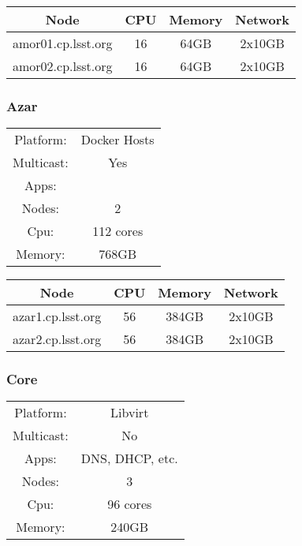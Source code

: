 \begin{center}
  \begin{tabular}{||c c c c||} 
    \hline
    Node & CPU & Memory & Network \\ [0.5ex] 
    \hline\hline
    amor01.cp.lsst.org & 16 & 64GB & 2x10GB \\
    \hline
    amor02.cp.lsst.org & 16 & 64GB & 2x10GB \\
    \hline
  \end{tabular}
\end{center}

\subsubsection{Azar}

\begin{center}
  \begin{tabular}{ |c|c| } 
   \hline
   Platform: & Docker Hosts \\ 
   Multicast: & Yes \\ 
   Apps: &  \\ 
   Nodes: & 2 \\ 
   Cpu: & 112 cores \\ 
   Memory: & 768GB \\ 
   \hline
  \end{tabular}
\end{center}

\begin{center}
  \begin{tabular}{||c c c c||} 
    \hline
    Node & CPU & Memory & Network \\ [0.5ex] 
    \hline\hline
    azar1.cp.lsst.org & 56 & 384GB & 2x10GB \\
    \hline
    azar2.cp.lsst.org & 56 & 384GB & 2x10GB \\
    \hline
  \end{tabular}
\end{center}

\newpage
\subsubsection{Core}

\begin{center}
  \begin{tabular}{ |c|c| } 
   \hline
   Platform: & Libvirt \\ 
   Multicast: & No \\ 
   Apps: & DNS, DHCP, etc. \\ 
   Nodes: & 3 \\ 
   Cpu: & 96 cores \\ 
   Memory: & 240GB \\ 
   \hline
  \end{tabular}
\end{center}

